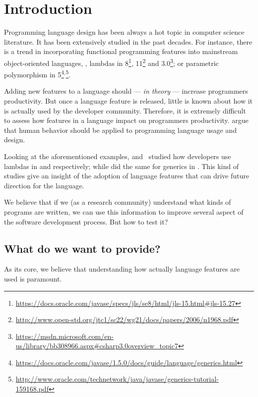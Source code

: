 
\chapter{Introduction}

Programming language design has been always a hot topic in computer science literature.
It has been extensively studied in the past decades.
For instance, there is a trend in incorporating functional programming features into mainstream object-oriented languages, \eg{}, lambdas in \java{} 8\footnote{\url{https://docs.oracle.com/javase/specs/jls/se8/html/jls-15.html\#jls-15.27}}, \cpp{}11\footnote{\url{http://www.open-std.org/jtc1/sc22/wg21/docs/papers/2006/n1968.pdf}} and \cs{} 3.0\footnote{\url{https://msdn.microsoft.com/en-us/library/bb308966.aspx\#csharp3.0overview_topic7}};
or parametric polymorphism in \java{} 5\footnote{\url{https://docs.oracle.com/javase/1.5.0/docs/guide/language/generics.html}}$^{,}$\footnote{\url{http://www.oracle.com/technetwork/java/javase/generics-tutorial-159168.pdf}}.

Adding new features to a language should --- \emph{in theory} --- increase programmers productivity.
But once a language feature is released, little is known about how it is actually used by the developer community.
Therefore, it is extremely difficult to assess how features in a language impact on programmers productivity.
\cite{hanenberg_faith_2010,hanenberg_why_2014} argue that human behavior should be applied to programming language usage and design.

Looking at the aforementioned examples, \cite{mazinanian_understanding_2017} and~\cite{uesbeck_empirical_2016}
studied how developers use lambdas in \java{} and \cpp{} respectively; while \cite{parnin_java_2011,parnin_adoption_2013} did the same for generics in \java{}.
This kind of studies give an insight of the adoption of language features that can drive future direction for the language.

We believe that if we (as a research community) understand what kinds of programs are written, we can use this information to improve several aspect of the software development process.
But how to test it?


\section{What do we want to provide?}

As its core, we believe that understanding how actually language features are
used is paramount.


